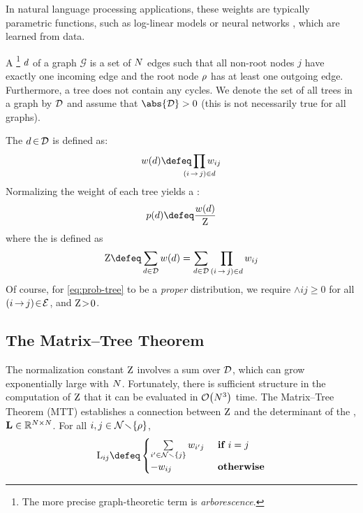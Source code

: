 \documentclass[11pt,a4paper]{article}
\newcommand{\ar}{arborescence\xspace}
\theoremstyle{definition}
\begin{document}
In natural language processing applications, these weights are typically parametric functions, such as log-linear models \citep{mcdonald-etal-2005-non} or neural networks \citep{dozat, ma}, which are learned from data.

A \footnote{The more precise graph-theoretic term is \emph{\ar{}}.} ${d}$ of a graph $\mathcal{G}$ is a set of ${N}$ edges such that all non-root nodes $j$ have exactly one incoming edge and the root node ${\rho}$ has at least one outgoing edge.
Furthermore, a tree does not contain any cycles.
We denote the set of all trees in a graph by ${\mathcal{D}}$ and assume that $\abs{\st}>0$ (this is not necessarily true for all graphs).


The  ${d} \,{\in}\, {\mathcal{D}}$ is defined as:
\begin{equation}
    \wtree{\tree} \defeq \smashoperator{\prod_{\edgeij\in\tree}} \wedge{ij}
\end{equation}
Normalizing the weight of each tree yields a :
\begin{equation}\label{eq:prob-tree}
    \ptree{\tree} \defeq \frac{\wtree{\tree}}{\wbar}
\end{equation}
where the  is defined as
\begin{equation}
    \wbar \defeq \sumtree \wtree{\tree}=\sumtree \prod_{\edgeij \in \tree} \wedge{ij}
\end{equation}
Of course, for \cref{eq:prob-tree} to be a \emph{proper} distribution, we require $\wedge{ij}\! \ge\! 0$ for all ${(i\,{\rightarrow}\,j)}\!\in\!{\mathcal{E}}$, and ${\mathrm{Z}}\! >\! 0$.

\subsection{The Matrix--Tree Theorem}\label{sec:mtt}
The normalization constant ${\mathrm{Z}}$ involves a sum over ${\mathcal{D}}$, which can grow exponentially large with ${N}$.  
Fortunately, there is sufficient structure in the computation of ${\mathrm{Z}}$ that it can be evaluated in $\mathcal{O}\!\left({N}^3\right)$ time. 
The Matrix--Tree Theorem (MTT) \citep{tutte1984graph,kirchhoff} establishes a connection between ${\mathrm{Z}}$ and the determinant of the , ${\mathbf{L}}\in\mathbb{R}^{{N}\times {N}}$.
For all $i,j\in{\mathcal{N}}\!\smallsetminus\!\{{\rho}\}$, 
\begin{equation}\label{eq:lap}
    \lapelem{ij} \defeq
    \begin{cases}
    \sum\limits_{i'\in\nodes\setminus\{j\}}\wedge{i'j} & \textbf{ if } i=j \\
    -\wedge{ij} & \textbf{ otherwise}
    \end{cases}
\end{equation}
\end{document}
